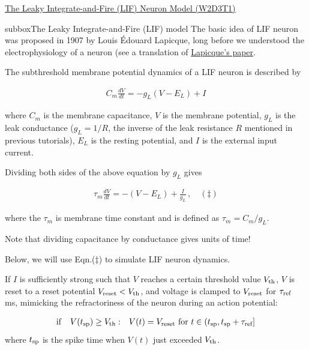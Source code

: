 \clearpage
\begin{textbox}{\href{https://compneuro.neuromatch.io/tutorials/W1D4_GeneralizedLinearModels/student/W1D4_Tutorial1.html}{The Leaky Integrate-and-Fire (LIF) Neuron Model (W2D3T1)} }
\begin{subbox}{subbox}{The Leaky Integrate-and-Fire (LIF) model}
\scriptsize
The basic idea of LIF neuron was proposed in 1907 by Louis Édouard Lapicque, long before we understood the electrophysiology of a neuron (see a translation of \href{https://pubmed.ncbi.nlm.nih.gov/17968583/}{Lapicque's paper}. 

The subthreshold membrane potential dynamics of a LIF neuron is described by

\begin{eqnarray}
C_m\frac{dV}{dt} = -g_L(V-E_L) + I
\end{eqnarray}

where $C_m$ is the membrane capacitance, $V$ is the membrane potential, $g_L$ is the leak conductance ($g_L = 1/R$, the inverse of the leak resistance $R$ mentioned in previous tutorials), $E_L$ is the resting potential, and $I$ is the external input current. 

Dividing both sides of the above equation by $g_L$ gives

\begin{align}
\tau_m\frac{dV}{dt} = -(V-E_L) + \frac{I}{g_L}\,,\quad (\ddagger)
\end{align}

where the $\tau_m$ is membrane time constant and is defined as $\tau_m=C_m/g_L$. 

Note that dividing capacitance by conductance gives units of time! 

Below, we will use Eqn.($\ddagger$) to simulate LIF neuron dynamics. 

If $I$ is sufficiently strong such that $V$ reaches a certain threshold value $V_{\rm th}$, $V$ is reset to a reset potential $V_{\rm reset}< V_{\rm th}$, and voltage is clamped to $V_{\rm reset}$ for $\tau_{\rm ref}$ ms, mimicking the refractoriness of the neuron during an action potential:

\begin{eqnarray*}
\mathrm{if}\quad V(t_{\text{sp}})\geq V_{\rm th}&:& V(t)=V_{\rm reset} \text{  for } t\in(t_{\text{sp}}, t_{\text{sp}} + \tau_{\text{ref}}]
\end{eqnarray*}
where $t_{\rm sp}$ is the spike time when $V(t)$ just exceeded $V_{\rm th}$.


\end{subbox}
\end{textbox}
